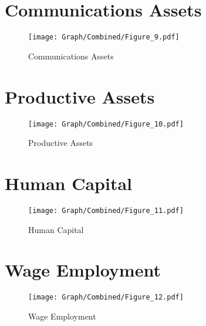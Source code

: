 \documentclass[10pt,a4paper]{article}
\begin{document}
\section{Communications Assets}
\begin{table}[H]\centering

\end{table}
\begin{figure}[H]\centering
\texttt{[image: Graph/Combined/Figure\_9.pdf]}
\caption{Communications Assets} \label{fig:Fig_9}
\end{figure}
\begin{table}[H]\centering

\end{table}
\pagebreak
\section{Productive Assets}
\begin{table}[H]\centering

\end{table}
\begin{figure}[H]\centering
\texttt{[image: Graph/Combined/Figure\_10.pdf]}
\caption{Productive Assets} \label{fig:Fig_10}
\end{figure}
\begin{table}[H]\centering

\end{table}
\pagebreak
\section{Human Capital}
\begin{table}[H]\centering

\end{table}
\begin{figure}[H]\centering
\texttt{[image: Graph/Combined/Figure\_11.pdf]}
\caption{Human Capital} \label{fig:Fig_11}
\end{figure}
\begin{table}[H]\centering

\end{table}
\pagebreak
\section{Wage Employment}
\begin{table}[H]\centering

\end{table}
\begin{figure}[H]\centering
\texttt{[image: Graph/Combined/Figure\_12.pdf]}
\caption{Wage Employment} \label{fig:Fig_12}
\end{figure}
\begin{table}[H]\centering

\end{table}
\pagebreak
\end{document}
